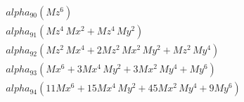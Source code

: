 \documentclass{article}
\begin{document}
\begin{align*}
  &\quad alpha_{90} \left(Mz^{6}\right) \\
  &\quad alpha_{91} \left(Mz^{4}\,Mx^{2} + Mz^{4}\,My^{2}\right) \\
  &\quad alpha_{92} \left(Mz^{2}\,Mx^{4} + 2Mz^{2}\,Mx^{2}\,My^{2} + Mz^{2}\,My^{4}\right) \\
  &\quad alpha_{93} \left(Mx^{6} + 3Mx^{4}\,My^{2} + 3Mx^{2}\,My^{4} + My^{6}\right) \\
  &\quad alpha_{94} \left(11Mx^{6} + 15Mx^{4}\,My^{2} + 45Mx^{2}\,My^{4} + 9My^{6}\right)
\end{align*}
\end{document}
